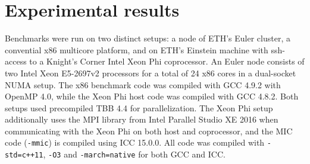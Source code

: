\section{Experimental results}\sloppy
\label{sec:exp}


Benchmarks were run on two distinct setups: a node of ETH's Euler cluster, a convential x86 multicore platform, and on ETH's Einstein machine with ssh-access to a Knight's Corner Intel Xeon Phi coprocessor. An Euler node consists of two Intel Xeon E5-2697v2 processors for a total of 24 x86 cores in a dual-socket NUMA setup. The x86 benchmark code was compiled with GCC 4.9.2 with OpenMP 4.0, while the Xeon Phi host code was compiled with GCC 4.8.2. Both setups used precompiled TBB 4.4 for
parallelization. The Xeon
Phi setup additionally uses the MPI library from Intel Parallel Studio XE 2016 when communicating with the Xeon Phi on both host and coprocessor, and the MIC code (\texttt{-mmic}) is compiled using ICC 15.0.0. All code was compiled with \texttt{-std=c++11}, \texttt{-O3} and \texttt{-march=native} for both GCC and ICC. 



